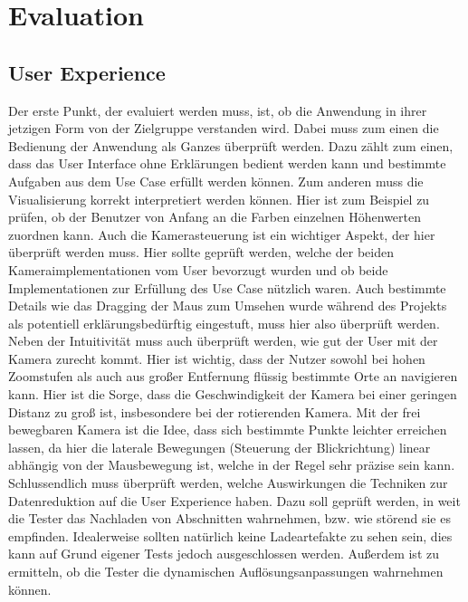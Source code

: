 \chapter{Evaluation}\label{chapter6}

\section{User Experience}
Der erste Punkt, der evaluiert werden muss, ist, ob die Anwendung in ihrer jetzigen Form von der Zielgruppe verstanden wird. Dabei muss zum einen die Bedienung der Anwendung als Ganzes überprüft werden. Dazu zählt zum einen, dass das User Interface ohne Erklärungen bedient werden kann und bestimmte Aufgaben aus dem Use Case erfüllt werden können. Zum anderen muss die Visualisierung korrekt interpretiert werden können. Hier ist zum Beispiel zu prüfen, ob der Benutzer von Anfang an die Farben einzelnen Höhenwerten zuordnen kann. Auch die Kamerasteuerung ist ein wichtiger Aspekt, der hier überprüft werden muss. Hier sollte geprüft werden, welche der beiden Kameraimplementationen vom User bevorzugt wurden und ob beide Implementationen zur Erfüllung des Use Case nützlich waren. Auch bestimmte Details wie das Dragging der Maus zum Umsehen wurde während des Projekts als potentiell erklärungsbedürftig eingestuft, muss hier also überprüft werden. Neben der Intuitivität muss auch überprüft werden, wie gut der User mit der Kamera zurecht kommt. Hier ist wichtig, dass der Nutzer sowohl bei hohen Zoomstufen als auch aus großer Entfernung flüssig bestimmte Orte an navigieren kann. Hier ist die Sorge, dass die Geschwindigkeit der Kamera bei einer geringen Distanz zu groß ist, insbesondere bei der rotierenden Kamera. Mit der frei bewegbaren Kamera ist die Idee, dass sich bestimmte Punkte leichter erreichen lassen, da hier die laterale Bewegungen (Steuerung der Blickrichtung) linear abhängig von der Mausbewegung ist, welche in der Regel sehr präzise sein kann. Schlussendlich muss überprüft werden, welche Auswirkungen die Techniken zur Datenreduktion auf die User Experience haben. Dazu soll geprüft werden, in weit die Tester das Nachladen von Abschnitten wahrnehmen, bzw. wie störend sie es empfinden. Idealerweise sollten natürlich keine Ladeartefakte zu sehen sein, dies kann auf Grund eigener Tests jedoch ausgeschlossen werden. Außerdem ist zu ermitteln, ob die Tester die dynamischen Auflösungsanpassungen wahrnehmen können.

